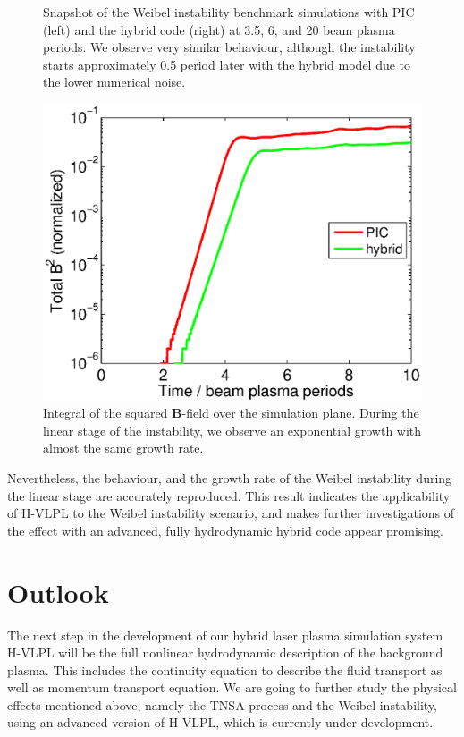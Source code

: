 \documentclass[conference]{IEEEtran}
\renewcommand{\~}{\widetilde }
\begin{document}
\begin{figure}[H]
\begin{center}
\begin{minipage}{0.40\columnwidth}
\begin{center}
		\end{center}
	\end{minipage}%
\end{center}
	\caption{Snapshot of the Weibel instability benchmark
	simulations with PIC (left) and the hybrid code (right) at
	3.5, 6, and 20 beam plasma periods. We observe very similar
	behaviour, although the instability starts approximately 0.5
	period later with the hybrid model due to the lower numerical noise.}
\end{figure}

\begin{figure}[h]
	\begin{center}
		\includegraphics[width=1.0\columnwidth]{Btotal.eps}
		\caption{Integral of the squared \textbf{B}-field over the simulation plane. During the linear stage of the instability, we observe an exponential growth with almost the same
			growth rate.}
	\end{center}
\end{figure}


Nevertheless, the behaviour, and the growth rate of the Weibel instability during the linear stage are accurately reproduced. This result indicates the applicability of H-VLPL to the Weibel instability scenario, and makes further investigations of the effect with an advanced, fully hydrodynamic hybrid code appear promising.

\section{Outlook}
The next step in the development of our hybrid laser plasma simulation
system H-VLPL will be the full nonlinear hydrodynamic description of
the background plasma. This includes the continuity equation to
describe the fluid transport as well as momentum transport equation. 
We are going to further study the physical effects mentioned above,
namely the TNSA process and the Weibel instability, using an advanced
version of H-VLPL, which is currently under development. 
\end{document}
